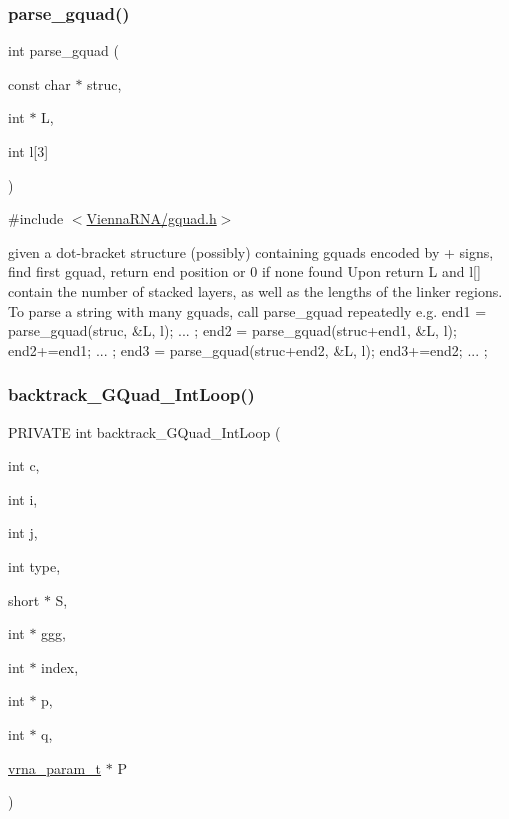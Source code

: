 \subsubsection{\texorpdfstring{parse\+\_\+gquad()}{parse\_gquad()}}
{\footnotesize\ttfamily int parse\+\_\+gquad (\begin{DoxyParamCaption}\item[{const char $\ast$}]{struc,  }\item[{int $\ast$}]{L,  }\item[{int}]{l\mbox{[}3\mbox{]} }\end{DoxyParamCaption})}



{\ttfamily \#include $<$\hyperlink{gquad_8h}{Vienna\+R\+N\+A/gquad.\+h}$>$}

given a dot-\/bracket structure (possibly) containing gquads encoded by \textquotesingle{}+\textquotesingle{} signs, find first gquad, return end position or 0 if none found Upon return L and l\mbox{[}\mbox{]} contain the number of stacked layers, as well as the lengths of the linker regions. To parse a string with many gquads, call parse\+\_\+gquad repeatedly e.\+g. end1 = parse\+\_\+gquad(struc, \&\+L, l); ... ; end2 = parse\+\_\+gquad(struc+end1, \&L, l); end2+=end1; ... ; end3 = parse\+\_\+gquad(struc+end2, \&L, l); end3+=end2; ... ; \mbox{\label{group__gquads_ga220c41e8dbcee940ac975b8ce88e55c5}} 
\subsubsection{\texorpdfstring{backtrack\+\_\+\+G\+Quad\+\_\+\+Int\+Loop()}{backtrack\_GQuad\_IntLoop()}}
{\footnotesize\ttfamily P\+R\+I\+V\+A\+TE int backtrack\+\_\+\+G\+Quad\+\_\+\+Int\+Loop (\begin{DoxyParamCaption}\item[{int}]{c,  }\item[{int}]{i,  }\item[{int}]{j,  }\item[{int}]{type,  }\item[{short $\ast$}]{S,  }\item[{int $\ast$}]{ggg,  }\item[{int $\ast$}]{index,  }\item[{int $\ast$}]{p,  }\item[{int $\ast$}]{q,  }\item[{\hyperlink{group__energy__parameters_ga8a69ca7d787e4fd6079914f5343a1f35}{vrna\+\_\+param\+\_\+t} $\ast$}]{P }\end{DoxyParamCaption})}



